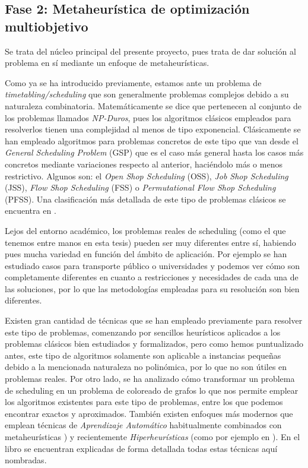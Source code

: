 \subsection{Fase 2: Metaheurística de optimización multiobjetivo} \label{sec:3:metaheurística}
Se trata del núcleo principal del presente proyecto, pues trata de dar solución al problema en sí mediante un enfoque de metaheurísticas.

Como ya se ha introducido previamente, estamos ante un problema de \textit{timetabling/scheduling} que son generalmente problemas complejos debido a su naturaleza combinatoria. 
Matemáticamente se dice que pertenecen al conjunto de los problemas llamados \textit{NP-Duros}, pues los algoritmos clásicos empleados para resolverlos tienen una complejidad al menos de tipo exponencial.
Clásicamente se han empleado algoritmos para problemas concretos de este tipo que van desde el \textit{General Scheduling Problem} (GSP) que es el caso más general hasta los casos más concretos mediante variaciones respecto al anterior, haciéndolo más o menos restrictivo. 
Algunos son: el \textit{Open Shop Scheduling} (OSS), \textit{Job Shop Scheduling} (JSS), \textit{Flow Shop Scheduling} (FSS) o \textit{Permutational Flow Shop Scheduling} (PFSS). Una clasificación más detallada de este tipo de problemas clásicos se encuentra en \cite{sota:tesis-doctoral}. 

Lejos del entorno académico, los problemas reales de scheduling (como el que tenemos entre manos en esta tesis) pueden ser muy diferentes entre sí, habiendo pues mucha variedad en función del ámbito de aplicación. 
Por ejemplo se han estudiado casos para transporte público \cite{sota:transporte-publico} o universidades \cite{sota:universidad} y podemos ver cómo son completamente diferentes en cuanto a restricciones y necesidades de cada una de las soluciones, por lo que las metodologías empleadas para su resolución son bien diferentes.

Existen gran cantidad de técnicas que se han empleado previamente para resolver este tipo de problemas, comenzando por sencillos heurísticos aplicados a los problemas clásicos bien estudiados y formalizados, pero como hemos puntualizado antes, este tipo de algoritmos solamente son aplicable a instancias pequeñas debido a la mencionada naturaleza no polinómica, por lo que no son útiles en problemas reales. Por otro lado, se ha analizado cómo transformar un problema de scheduling en un problema de coloreado de grafos \cite{sota:estudio-coloreado-grafos, sota:algotimo-coloreado-grafos} lo que nos permite emplear los algoritmos existentes para este tipo de problemas, entre los que podemos encontrar exactos y aproximados. También existen enfoques más modernos que emplean técnicas de \textit{Aprendizaje Automático} habitualmente combinados con metaheurísticas \cite{sota:machine-learning-geneticos}) y recientemente \textit{Hiperheurísticas} (como por ejemplo en \cite{sota:hiperheuristicas}). En el libro \cite{sota:libro-sota-scheduling} se encuentran explicadas de forma detallada todas estas técnicas aquí nombradas.

